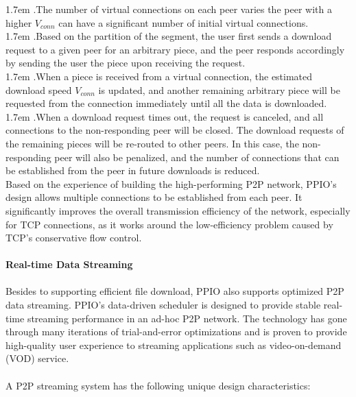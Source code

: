 \documentclass[10pt,a4paper]{article}
\begin{document}
\hangindent 1.7em
.\quad The number of virtual connections on each peer varies the peer with a higher $V_{conn}$ can have a significant number of initial virtual connections.
\vspace{-0.8em}
\\ 

\hangindent 1.7em
.\quad Based on the partition of the segment, the user first sends a download request to a given peer for an arbitrary piece, and the peer responds accordingly by sending the user the piece upon receiving the request.
\vspace{-0.8em}
\\ 

\hangindent 1.7em
.\quad When a piece is received from a virtual connection, the estimated download speed $V_{conn}$ is updated, and another remaining arbitrary piece will be requested from the connection immediately until all the data is downloaded.
\vspace{-0.8em}
\\ 

\hangindent 1.7em
.\quad When a download request times out, the request is canceled, and all connections to the non-responding peer will be closed. The download requests of the remaining pieces will be re-routed to other peers. In this case, the non-responding peer will also be penalized, and the number of connections that can be established from the peer in future downloads is reduced.  
\vspace{-0.5em}
\\ 

\noindent   
Based on the experience of building the high-performing P2P network, PPIO's design allows multiple connections to be established from each peer. It significantly improves the overall transmission efficiency of the network, especially for TCP connections, as it works around the low-efficiency problem caused by TCP's conservative flow control.
\vspace{-0.5em}
\\ \\ {\bf Real-time Data Streaming}
\vspace{-0.5em}
\\ \\Besides to supporting efficient file download, PPIO also supports optimized P2P data streaming. PPIO's data-driven scheduler is designed to provide stable real-time streaming performance in an ad-hoc P2P network\cite{article12}. The technology has gone through many iterations of trial-and-error optimizations and is proven to provide high-quality user experience to streaming applications such as video-on-demand (VOD) service.
\vspace{-0.5em}
\\ \\A P2P streaming system has the following unique design characteristics:
\vspace{-0.8em}
\\
\end{document}
